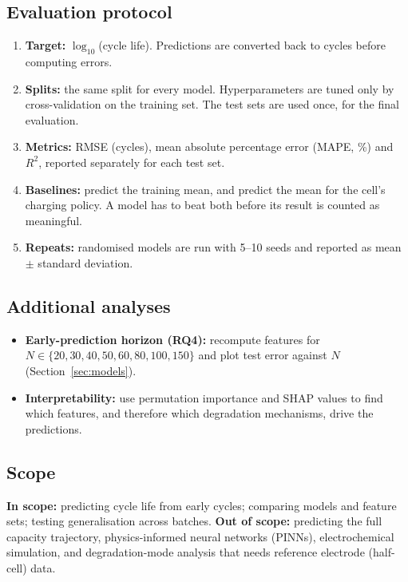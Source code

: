 \subsection{Evaluation protocol}
\begin{enumerate}
  \item \textbf{Target:} $\log_{10}$(cycle life). Predictions are converted
  back to cycles before computing errors.
  \item \textbf{Splits:} the same split for every model. Hyperparameters are
  tuned only by cross-validation on the training set. The test sets are
  used once, for the final evaluation.
  \item \textbf{Metrics:} RMSE (cycles), mean absolute percentage error
  (MAPE, \%) and $R^2$, reported separately for each test set.
  \item \textbf{Baselines:} predict the training mean, and predict the mean
  for the cell's charging policy. A model has to beat both before its
  result is counted as meaningful.
  \item \textbf{Repeats:} randomised models are run with 5--10 seeds and
  reported as mean $\pm$ standard deviation.
\end{enumerate}

\subsection{Additional analyses}
\begin{itemize}
  \item \textbf{Early-prediction horizon (RQ4):} recompute features for
  $N\in\{20,30,40,50,60,80,100,150\}$ and plot test error against $N$
  (Section~\ref{sec:models}).
  \item \textbf{Interpretability:} use permutation importance and SHAP values
  to find which features, and therefore which degradation mechanisms,
  drive the predictions.
\end{itemize}

\subsection{Scope}
\textbf{In scope:} predicting cycle life from early cycles; comparing
models and feature sets; testing generalisation across batches.
\textbf{Out of scope:} predicting the full capacity trajectory,
physics-informed neural networks (PINNs), electrochemical simulation, and
degradation-mode analysis that needs reference electrode (half-cell) data.


